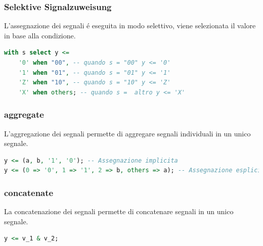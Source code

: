         \subsubsection{Selektive Signalzuweisung}
            L'assegnazione dei segnali é eseguita in modo selettivo, viene selezionata il valore in base alla condizione.
            \begin{lstlisting}[language=VHDL]
with s select y <=
    '0' when "00", -- quando s = "00" y <= '0'
    '1' when "01", -- quando s = "01" y <= '1'
    'Z' when "10", -- quando s = "10" y <= 'Z'
    'X' when others; -- quando s =  altro y <= 'X'
            \end{lstlisting}
    
        \subsubsection{aggregate}
            L'aggregazione dei segnali permette di aggregare segnali individuali in un unico segnale.
            \begin{lstlisting}[language=VHDL]
y <= (a, b, '1', '0'); -- Assegnazione implicita
y <= (0 => '0', 1 => '1', 2 => b, others => a); -- Assegnazione esplicita (<posizione_vettoriale> => <valore>)
            \end{lstlisting}
    
        \subsubsection{concatenate}
            La concatenazione dei segnali permette di concatenare segnali in un unico segnale.
            \begin{lstlisting}[language=VHDL]
y <= v_1 & v_2;
            \end{lstlisting}


